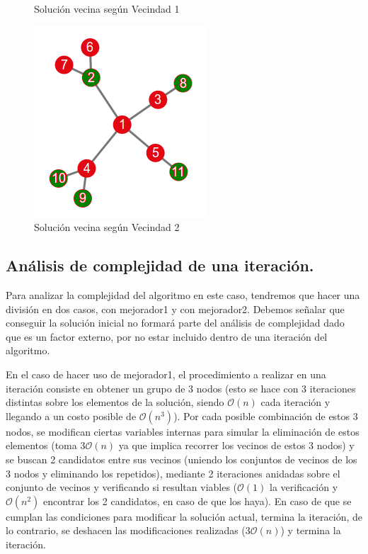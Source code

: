 \begin{figure}[!htb]
\begin{center}
\end{center}
  \caption{Solución vecina según Vecindad 1}\label{fig:vec1}
\endminipage\hfill
{}
\begin{center}
  \includegraphics[scale=0.8]{imagenes/estrellitavec2.png}
\end{center}
  \caption{Solución vecina según Vecindad 2}\label{fig:vec2}
\endminipage
\end{figure}
 
 
\vspace*{0.6cm}


\subsection{Análisis de complejidad de una iteración.}

Para analizar la complejidad del algoritmo en este caso, tendremos que hacer una división en dos casos, con mejorador1 y con mejorador2.
Debemos señalar que conseguir la solución inicial no formará parte del análisis de complejidad dado que es un factor externo, por no estar incluido dentro de una iteración del algoritmo.

En el caso de hacer uso de mejorador1, el procedimiento a realizar en una iteración consiste en obtener un grupo de 3 nodos (esto se hace con 3 iteraciones distintas sobre los elementos de la solución, siendo $\mathcal{O}(n)$ cada iteración y llegando a un costo posible de $\mathcal{O}(n^3)$). Por cada posible combinación de estos 3 nodos, se modifican ciertas variables internas para simular la eliminación de estos elementos (toma $3\mathcal{O}(n)$ ya que implica recorrer los vecinos de estos 3 nodos) y se buscan 2 candidatos entre sus vecinos (uniendo los conjuntos de vecinos de los 3 nodos y eliminando los repetidos), mediante 2 iteraciones anidadas sobre el conjunto de vecinos y verificando si resultan viables ($\mathcal{O}(1)$ la verificación y $\mathcal{O}(n^2)$ encontrar los 2 candidatos, en caso de que los haya). En caso de que se cumplan las condiciones para modificar la solución actual, termina la iteración, de lo contrario, se deshacen las modificaciones realizadas ($3\mathcal{O}(n)$) y termina la iteración.

